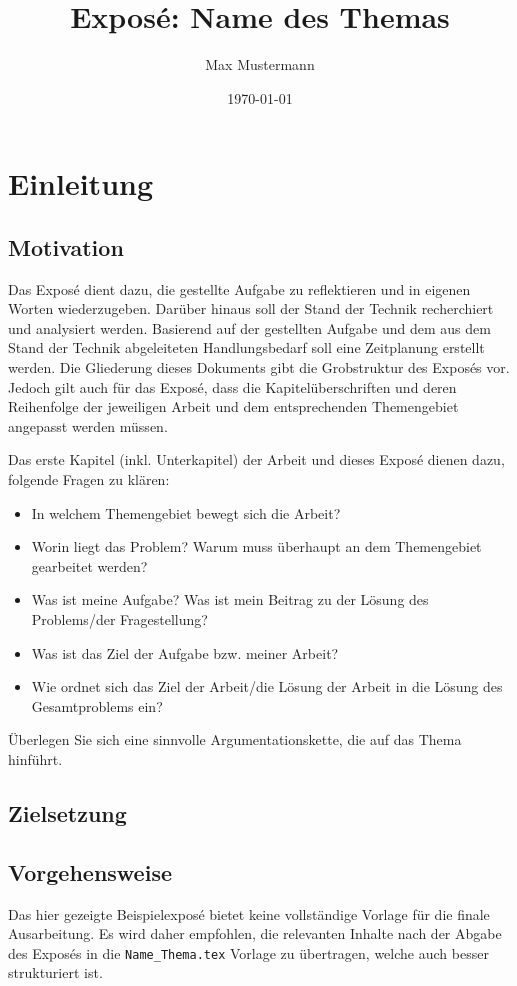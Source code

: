 \documentclass[ a4paper,
                toc=bibliography
              ]{scrartcl}
\author{Max Mustermann}
\title{Exposé: Name des Themas}
\date{\today}
\begin{document}
\maketitle
	
\section{Einleitung}
\subsection{Motivation}

Das Exposé dient dazu, die gestellte Aufgabe zu reflektieren und in eigenen Worten wiederzugeben. 
Darüber hinaus soll der Stand der Technik recherchiert und analysiert werden. Basierend auf der gestellten Aufgabe und dem aus dem Stand der Technik abgeleiteten Handlungsbedarf soll eine Zeitplanung erstellt werden. 
Die Gliederung dieses Dokuments gibt die Grobstruktur des Exposés vor. Jedoch gilt auch für das Exposé, dass die Kapitelüberschriften und deren Reihenfolge der jeweiligen Arbeit und dem entsprechenden Themengebiet angepasst werden müssen.

Das erste Kapitel (inkl. Unterkapitel) der Arbeit und dieses Exposé dienen dazu, folgende Fragen zu klären:

\begin{itemize}
    \item In welchem Themengebiet bewegt sich die Arbeit?
    \item Worin liegt das Problem? Warum muss überhaupt an dem Themengebiet gearbeitet werden?
    \item Was ist meine Aufgabe? Was ist mein Beitrag zu der Lösung des Problems/der Fragestellung?
    \item Was ist das Ziel der Aufgabe bzw. meiner Arbeit?
    \item Wie ordnet sich das Ziel der Arbeit/die Lösung der Arbeit in die Lösung des Gesamtproblems ein?
\end{itemize}

Überlegen Sie sich eine sinnvolle Argumentationskette, die auf das Thema hinführt.


\subsection{Zielsetzung}

\subsection{Vorgehensweise}
Das hier gezeigte Beispielexposé bietet keine vollständige Vorlage für die finale Ausarbeitung. Es wird daher empfohlen, die relevanten Inhalte nach der Abgabe des Exposés in die \texttt{Name\_Thema.tex} Vorlage zu übertragen, welche auch besser strukturiert ist.
\end{document}
